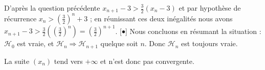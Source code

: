 {\begin{enumerate}
{\begin{itemize}
D'apr\`es la question pr\'ec\'edente $ x_{n+1}-3 >
\frac{3}{2}(x_n-3)$ et par hypoth\`ese de r\'ecurrence $x_n
>\left( \frac{3}{2}\right)^n+3$ ; en r\'eunissant ces deux
in\'egalit\'es nous avons $ x_{n+1}-3 >
\frac{3}{2}(\left(\frac{3}{2}\right)^n) =
\left(\frac{3}{2}\right)^{n+1}$.
[$\bullet$] Nous concluons en r\'esumant la situation :\\
$\mathcal{H}_{0}$ est vraie, et $\mathcal{H}_{n} \Rightarrow
\mathcal{H}_{n+1}$ quelque soit $n$. Donc $\mathcal{H}_{n}$ est
toujours vraie.
\end{itemize}
La suite $(x_n)$ tend vers $+\infty$ et n'est donc pas convergente.
}
\end{enumerate}
}
